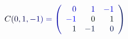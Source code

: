 \documentclass[12pt]{article}
\begin{document}
\makeatletter
\renewcommand*{\@textcolor}[3]{%
  \protect\leavevmode
  \begingroup
    \color#1{#2}#3%
  \endgroup
}
\makeatother
\begin{displaymath}
\mathcolor[RGB]{0,0,15}{C} \mathcolor[RGB]{0,0,30}{(} \mathcolor[RGB]{0,0,45}{0} \mathcolor[RGB]{0,0,60}{,} \mathcolor[RGB]{0,0,75}{1} \mathcolor[RGB]{0,0,90}{,} \mathcolor[RGB]{0,0,105}{-} \mathcolor[RGB]{0,0,120}{1} \mathcolor[RGB]{0,0,135}{)} \mathcolor[RGB]{0,0,150}{=} \mathcolor[RGB]{0,0,165}{\left(} \begin{array} {rrr} { \mathcolor[RGB]{0,0,180}{0} } & { \mathcolor[RGB]{0,0,195}{1} } & { \mathcolor[RGB]{0,0,210}{-} \mathcolor[RGB]{0,0,225}{1} } \\ { \mathcolor[RGB]{0,0,240}{-} \mathcolor[RGB]{0,0,255}{1} } & { \mathcolor[RGB]{0,15,0}{0} } & { \mathcolor[RGB]{0,15,15}{1} } \\ { \mathcolor[RGB]{0,15,30}{1} } & { \mathcolor[RGB]{0,15,45}{-} \mathcolor[RGB]{0,15,60}{1} } & { \mathcolor[RGB]{0,15,75}{0} } \end{array} \mathcolor[RGB]{0,15,90}{\right)}
\end{displaymath}
\end{document}
